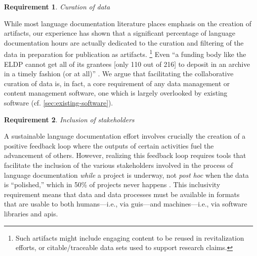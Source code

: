 \documentclass[11pt]{article}
\newtheorem{requirement}{Requirement}
\begin{document}
\begin{requirement}
	\label{req:curation}
       Curation of data
\end{requirement}

While most language documentation literature places emphasis on the creation of
artifacts, our experience has shown that a significant percentage of language
documentation hours are actually dedicated to the curation and filtering of the
data in preparation for publication as artifacts.%
\footnote{Such artifacts might include engaging content to be reused in
    revitalization efforts, or citable/traceable data sets used to support
research claims.}
Even ``a funding body like the ELDP cannot get all of its grantees [only 110
out of 216] to deposit in an archive in a timely fashion (or at all)''
\cite{Thieberger:2012}. We argue that
facilitating the collaborative curation of data is, in fact, a core requirement
of any data management or content management software, one which is largely
overlooked by existing software (cf.
\autoref{sec:existing-software}).


\begin{requirement}
	\label{req:inclusive}
       Inclusion of stakeholders
\end{requirement}

A sustainable language documentation effort involves crucially the creation of a
positive feedback loop where the outputs of certain activities fuel
the advancement of others.
However, realizing this feedback loop requires tools that facilitate the
inclusion of the various stakeholders involved in the process of language
documentation \emph{while} a project is underway, not \emph{post hoc} when
the data is ``polished,'' which in 50\% of projects never happens
\cite{Thieberger:2012}. This inclusivity requirement means that data and data
processes must be available in formats that are usable to both humans---i.e.,
via \glspl{gui}---and machines---i.e., via software libraries and \glspl{api}.
\end{document}
